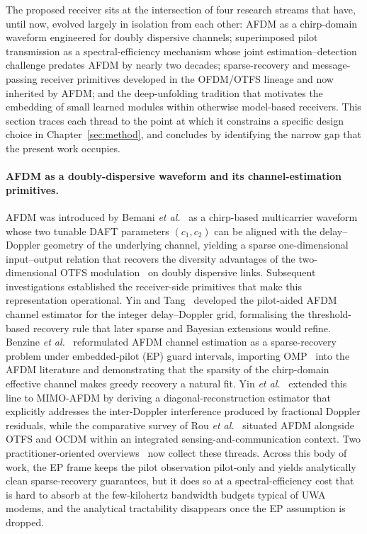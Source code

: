 The proposed receiver sits at the intersection of four research streams that
have, until now, evolved largely in isolation from each other: AFDM as a
chirp-domain waveform engineered for doubly dispersive channels; superimposed
pilot transmission as a spectral-efficiency mechanism whose joint
estimation--detection challenge predates AFDM by nearly two decades;
sparse-recovery and message-passing receiver primitives developed in the
OFDM/OTFS lineage and now inherited by AFDM; and the deep-unfolding tradition
that motivates the embedding of small learned modules within otherwise
model-based receivers. This section traces each thread to the point at which
it constrains a specific design choice in Chapter~\ref{sec:method}, and
concludes by identifying the narrow gap that the present work occupies.

\paragraph{AFDM as a doubly-dispersive waveform and its channel-estimation
primitives.}
AFDM was introduced by Bemani \emph{et al.}~\cite{bemani2023afdm} as a
chirp-based multicarrier waveform whose two tunable DAFT parameters $(c_1,
c_2)$ can be aligned with the delay--Doppler geometry of the underlying
channel, yielding a sparse one-dimensional input--output relation that
recovers the diversity advantages of the two-dimensional OTFS
modulation~\cite{hadani2017otfs,raviteja2018otfs,wei2021otfspromising} on
doubly dispersive links. Subsequent investigations established the
receiver-side primitives that make this representation operational. Yin and
Tang~\cite{yin2022fractionaldopplerafdm} developed the pilot-aided AFDM
channel estimator for the integer delay--Doppler grid, formalising the
threshold-based recovery rule that later sparse and Bayesian extensions would
refine. Benzine \emph{et al.}~\cite{benzine2023sparseafdm} reformulated AFDM
channel estimation as a sparse-recovery problem under embedded-pilot (EP)
guard intervals, importing OMP~\cite{tropp2007signal} into the AFDM
literature and demonstrating that the sparsity of the chirp-domain effective
channel makes greedy recovery a natural fit. Yin \emph{et
al.}~\cite{yin2024drceafdm} extended this line to MIMO-AFDM by deriving a
diagonal-reconstruction estimator that explicitly addresses the inter-Doppler
interference produced by fractional Doppler residuals, while the comparative
survey of Rou \emph{et al.}~\cite{rou2024otfstoafdm} situated AFDM alongside
OTFS and OCDM within an integrated sensing-and-communication context. Two
practitioner-oriented overviews~\cite{yin2025afdmoverview,zhou2025afdmicsc}
now collect these threads. Across this body of work, the EP frame keeps the
pilot observation pilot-only and yields analytically clean sparse-recovery
guarantees, but it does so at a spectral-efficiency cost that is hard to
absorb at the few-kilohertz bandwidth budgets typical of UWA modems, and the
analytical tractability disappears once the EP assumption is dropped.

